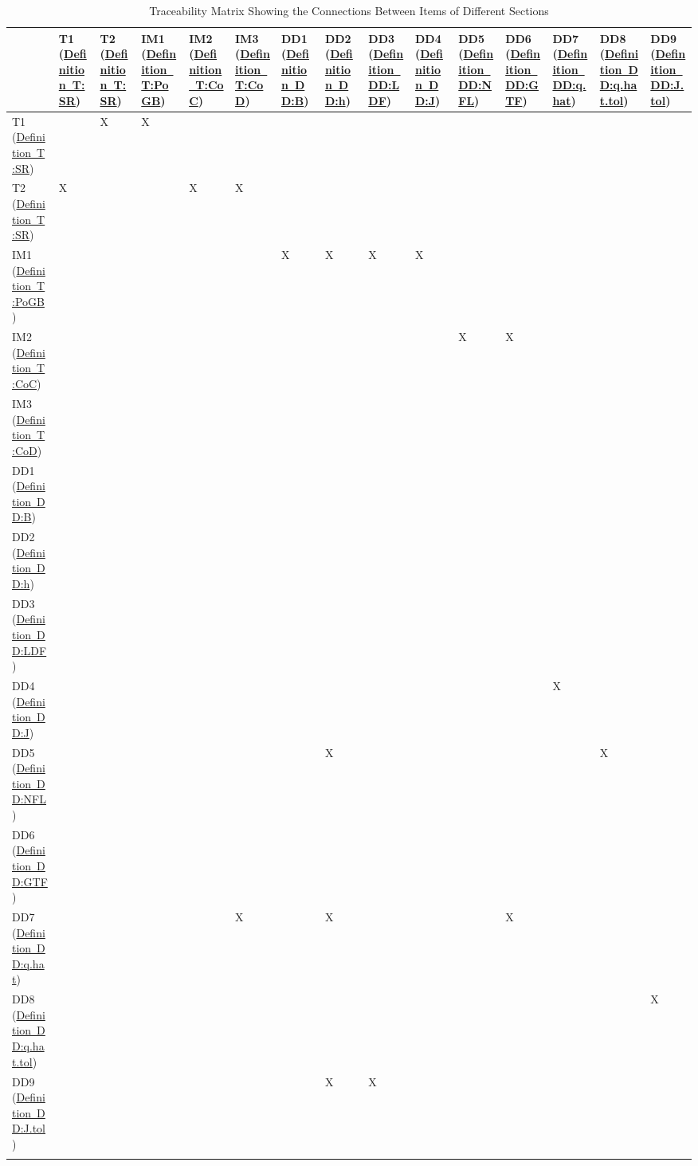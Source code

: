 \documentclass[12pt]{article}
\begin{document}
\begin{longtable}{l l l l l l l l l l l l l l l}
\toprule
 & T1 (\hyperref[T:SR]{Definition~T:SR}) & T2 (\hyperref[T:SR]{Definition~T:SR}) & IM1 (\hyperref[T:PoGB]{Definition~T:PoGB}) & IM2 (\hyperref[T:CoC]{Definition~T:CoC}) & IM3 (\hyperref[T:CoD]{Definition~T:CoD}) & DD1 (\hyperref[DD:B]{Definition~DD:B}) & DD2 (\hyperref[DD:h]{Definition~DD:h}) & DD3 (\hyperref[DD:LDF]{Definition~DD:LDF}) & DD4 (\hyperref[DD:J]{Definition~DD:J}) & DD5 (\hyperref[DD:NFL]{Definition~DD:NFL}) & DD6 (\hyperref[DD:GTF]{Definition~DD:GTF}) & DD7 (\hyperref[DD:q.hat]{Definition~DD:q.hat}) & DD8 (\hyperref[DD:q.hat.tol]{Definition~DD:q.hat.tol}) & DD9 (\hyperref[DD:J.tol]{Definition~DD:J.tol})
\\
\midrule
T1 (\hyperref[T:SR]{Definition~T:SR}) &  & X & X &  &  &  &  &  &  &  &  &  &  & 
\\
T2 (\hyperref[T:SR]{Definition~T:SR}) & X &  &  & X & X &  &  &  &  &  &  &  &  & 
\\
IM1 (\hyperref[T:PoGB]{Definition~T:PoGB}) &  &  &  &  &  & X & X & X & X &  &  &  &  & 
\\
IM2 (\hyperref[T:CoC]{Definition~T:CoC}) &  &  &  &  &  &  &  &  &  & X & X &  &  & 
\\
IM3 (\hyperref[T:CoD]{Definition~T:CoD}) &  &  &  &  &  &  &  &  &  &  &  &  &  & 
\\
DD1 (\hyperref[DD:B]{Definition~DD:B}) &  &  &  &  &  &  &  &  &  &  &  &  &  & 
\\
DD2 (\hyperref[DD:h]{Definition~DD:h}) &  &  &  &  &  &  &  &  &  &  &  &  &  & 
\\
DD3 (\hyperref[DD:LDF]{Definition~DD:LDF}) &  &  &  &  &  &  &  &  &  &  &  &  &  & 
\\
DD4 (\hyperref[DD:J]{Definition~DD:J}) &  &  &  &  &  &  &  &  &  &  &  & X &  & 
\\
DD5 (\hyperref[DD:NFL]{Definition~DD:NFL}) &  &  &  &  &  &  & X &  &  &  &  &  & X & 
\\
DD6 (\hyperref[DD:GTF]{Definition~DD:GTF}) &  &  &  &  &  &  &  &  &  &  &  &  &  & 
\\
DD7 (\hyperref[DD:q.hat]{Definition~DD:q.hat}) &  &  &  &  & X &  & X &  &  &  & X &  &  & 
\\
DD8 (\hyperref[DD:q.hat.tol]{Definition~DD:q.hat.tol}) &  &  &  &  &  &  &  &  &  &  &  &  &  & X
\\
DD9 (\hyperref[DD:J.tol]{Definition~DD:J.tol}) &  &  &  &  &  &  & X & X &  &  &  &  &  & 
\\
\bottomrule
\caption{Traceability Matrix Showing the Connections Between Items of Different Sections}
\label{Table:TMStCBIoDS}
\end{longtable}
\end{document}
